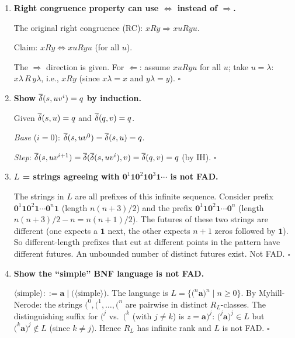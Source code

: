 \begin{enumerate}[{2.}1.]
\item \textbf{Right congruence property can use $\Leftrightarrow$ instead of $\Rightarrow$.}

The original right congruence (RC): $xRy\Rightarrow xuRyu$.

Claim: $xRy\Leftrightarrow xuRyu$ (for all $u$).

The $\Rightarrow$ direction is given. For $\Leftarrow$: assume $xuRyu$ for all $u$; take $u=\lambda$: $x\lambda\,R\,y\lambda$, i.e., $xRy$ (since $x\lambda=x$ and $y\lambda=y$). $\square$

\item \textbf{Show $\overline{\delta}(s,uv^i)=q$ by induction.}

Given $\overline{\delta}(s,u)=q$ and $\overline{\delta}(q,v)=q$.

\textit{Base} ($i=0$): $\overline{\delta}(s,uv^0)=\overline{\delta}(s,u)=q$. \checkmark

\textit{Step}: $\overline{\delta}(s,uv^{i+1})=\overline{\delta}(\overline{\delta}(s,uv^i),v)=\overline{\delta}(q,v)=q$ (by IH). $\square$

\item \textbf{$L$ = strings agreeing with $\mathbf{0}^1\mathbf{1}\mathbf{0}^2\mathbf{1}\mathbf{0}^3\mathbf{1}\cdots$ is not FAD.}

The strings in $L$ are all prefixes of this infinite sequence. Consider prefix $\mathbf{0}^1\mathbf{1}\mathbf{0}^2\mathbf{1}\cdots\mathbf{0}^n\mathbf{1}$ (length $n(n+3)/2$) and the prefix $\mathbf{0}^1\mathbf{1}\mathbf{0}^2\mathbf{1}\cdots\mathbf{0}^n$ (length $n(n+3)/2-n=n(n+1)/2$). The futures of these two strings are different (one expects a $\mathbf{1}$ next, the other expects $n+1$ zeros followed by $\mathbf{1}$). So different-length prefixes that cut at different points in the pattern have different futures. An unbounded number of distinct futures exist. Not FAD. $\square$

\item \textbf{Show the ``simple'' BNF language is not FAD.}

$\langle\text{simple}\rangle ::= \mathbf{a}\mid\mathbf{(}\langle\text{simple}\rangle\mathbf{)}$. The language is $L=\{\mathbf{(}^n\mathbf{a}\mathbf{)}^n\mid n\geq 0\}$. By Myhill-Nerode: the strings $\mathbf{(}^0,\mathbf{(}^1,\ldots,\mathbf{(}^n$ are pairwise in distinct $R_L$-classes. The distinguishing suffix for $\mathbf{(}^j$ vs.\ $\mathbf{(}^k$ (with $j\neq k$) is $z=\mathbf{a}\mathbf{)}^j$: $\mathbf{(}^j\mathbf{a}\mathbf{)}^j\in L$ but $\mathbf{(}^k\mathbf{a}\mathbf{)}^j\notin L$ (since $k\neq j$). Hence $R_L$ has infinite rank and $L$ is not FAD. $\square$


\end{enumerate}
